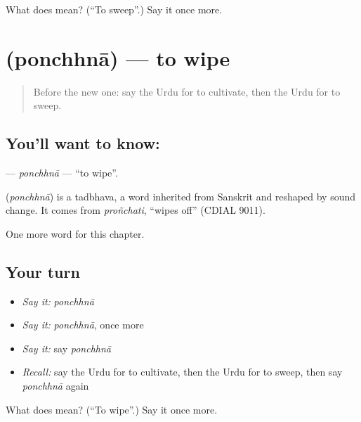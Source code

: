 \begin{tcolorbox}[breakable,colback=teal!4,colframe=teal!35!black,title={Before you move on}]
What does   mean? (\textquotedblleft{}To sweep\textquotedblright{}.) Say it once more.
\end{tcolorbox}
\section[\texorpdfstring{\ur{پونچھنا} (ponchhnā)}{پونچھنا (ponchhnā)}]{ (ponchhnā) — to wipe}

\label{lesson:UR-C241-ponchhna}



\begin{quote}
Before the new one: say the Urdu for to cultivate, then the Urdu for to sweep.
\end{quote}

\subsection*{You'll want to know: }
\textbf{} — \emph{ponchhnā} — \textquotedblleft{}to wipe\textquotedblright{}.

\begin{cousinweb}
\textbf{} (\emph{ponchhnā}) is a tadbhava, a word inherited from Sanskrit and reshaped by sound change. It comes from \emph{proñchati}, \textquotedblleft{}wipes off\textquotedblright{} (CDIAL 9011).
\end{cousinweb}

\begin{grammarlens}[title={What you've built}]
One more word for this chapter.
\end{grammarlens}

\subsection*{Your turn}
\begin{itemize}
\raggedright
  \item \emph{Say it:} \emph{ponchhnā}
  \item \emph{Say it:} \emph{ponchhnā}, once more
  \item \emph{Say it:} say \emph{ponchhnā}
  \item \emph{Recall:} say the Urdu for to cultivate, then the Urdu for to sweep, then say \emph{ponchhnā} again
\end{itemize}

\begin{tcolorbox}[breakable,colback=teal!4,colframe=teal!35!black,title={Before you move on}]
What does  mean? (\textquotedblleft{}To wipe\textquotedblright{}.) Say it once more.
\end{tcolorbox}
